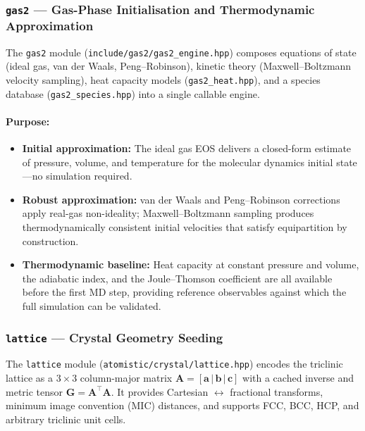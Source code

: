 \documentclass[11pt]{article}
\begin{document}
\subsubsection{\texttt{gas2} --- Gas-Phase Initialisation and Thermodynamic Approximation}

The \texttt{gas2} module (\texttt{include/gas2/gas2\_engine.hpp}) composes
equations of state (ideal gas, van der Waals, Peng--Robinson), kinetic
theory (Maxwell--Boltzmann velocity sampling), heat capacity models
(\texttt{gas2\_heat.hpp}), and a species database
(\texttt{gas2\_species.hpp}) into a single callable engine.

\paragraph{Purpose:}
\begin{itemize}
  \item \textbf{Initial approximation:} The ideal gas EOS delivers a
        closed-form estimate of pressure, volume, and temperature for the
        molecular dynamics initial state---no simulation required.
  \item \textbf{Robust approximation:} van der Waals and Peng--Robinson
        corrections apply real-gas non-ideality; Maxwell--Boltzmann
        sampling produces thermodynamically consistent initial velocities
        that satisfy equipartition by construction.
  \item \textbf{Thermodynamic baseline:} Heat capacity at constant pressure
        and volume, the adiabatic index, and the Joule--Thomson coefficient
        are all available before the first MD step, providing reference
        observables against which the full simulation can be validated.
\end{itemize}

\subsubsection{\texttt{lattice} --- Crystal Geometry Seeding}

The \texttt{lattice} module
(\texttt{atomistic/crystal/lattice.hpp}) encodes
the triclinic lattice as a $3 \times 3$ column-major matrix
$\mathbf{A} = [\mathbf{a}\,|\,\mathbf{b}\,|\,\mathbf{c}]$ with a
cached inverse and metric tensor
$\mathbf{G} = \mathbf{A}^\top \mathbf{A}$.
It provides Cartesian $\leftrightarrow$ fractional transforms, minimum
image convention (MIC) distances, and supports FCC, BCC, HCP, and
arbitrary triclinic unit cells.
\end{document}
